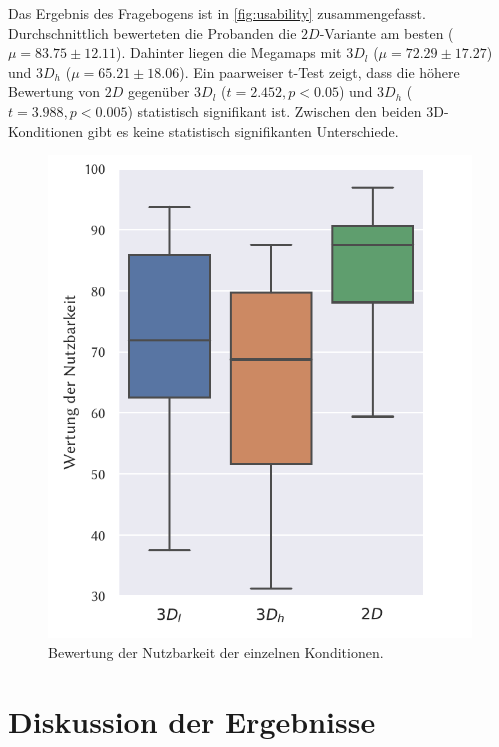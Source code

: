 Das Ergebnis des Fragebogens ist in \autoref{fig:usability} zusammengefasst.
Durchschnittlich bewerteten die Probanden die $2D$-Variante am besten ($\mu = \num{83,75} \pm \num{12,11}$).
Dahinter liegen die Megamaps mit $3D_l$ ($\mu = \num{72,29} \pm \num{17,27}$) und $3D_h$ ($\mu = \num{65,21} \pm \num{18.06}$).
Ein paarweiser t-Test zeigt, dass die höhere Bewertung von $2D$ gegenüber $3D_l$ ($t = 2.452, p < 0.05$) und $3D_h$ ($t = 3.988, p < 0.005$) statistisch signifikant ist.
Zwischen den beiden 3D-Konditionen gibt es keine statistisch signifikanten Unterschiede.
\begin{figure}
    \centering
    \includegraphics[width=0.7\linewidth]{figures/analysis/usability}
    \caption{Bewertung der Nutzbarkeit der einzelnen Konditionen.}
    \label{fig:usability}
\end{figure}



\section{Diskussion der Ergebnisse}

